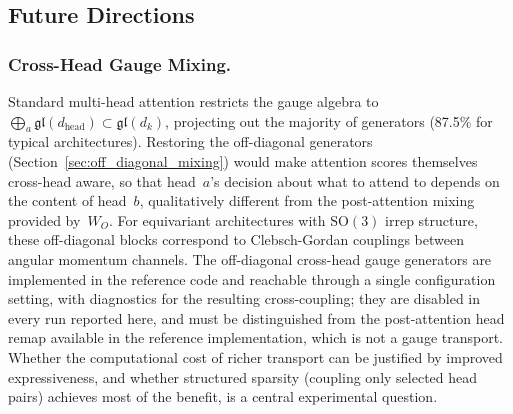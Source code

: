 \documentclass[twoside,11pt]{article}
\begin{document}
\subsection{Future Directions}

\subsubsection{Cross-Head Gauge Mixing.}
\label{sec:future_cross_head}

Standard multi-head attention restricts the gauge algebra to $\bigoplus_a \mathfrak{gl}(d_{\mathrm{head}}) \subset \mathfrak{gl}(d_k)$, projecting out the majority of generators (87.5\% for typical architectures). Restoring the off-diagonal generators (Section~\ref{sec:off_diagonal_mixing}) would make attention scores themselves cross-head aware, so that head~$a$'s decision about what to attend to depends on the content of head~$b$, qualitatively different from the post-attention mixing provided by~$W_O$. For equivariant architectures with $\mathrm{SO}(3)$ irrep structure, these off-diagonal blocks correspond to Clebsch-Gordan couplings between angular momentum channels. The off-diagonal cross-head gauge generators are implemented in the reference code and reachable through a single configuration setting, with diagnostics for the resulting cross-coupling; they are disabled in every run reported here, and must be distinguished from the post-attention head remap available in the reference implementation, which is not a gauge transport. Whether the computational cost of richer transport can be justified by improved expressiveness, and whether structured sparsity (coupling only selected head pairs) achieves most of the benefit, is a central experimental question.
\end{document}

